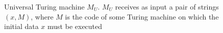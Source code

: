 \begin{figure}
\centering



\caption{Universal Turing machine $M_U$. $M_U$ receives as input
  a pair of strings $\left(x, M\right)$, where $M$ is the code
  of some Turing machine on which the initial
  data $x$ must be executed} 
\label{figAddAlgoUTuring}
\end{figure}